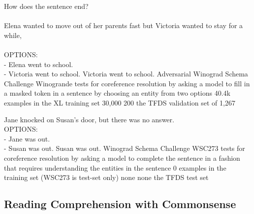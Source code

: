 \taskio
{How does the sentence end?\\\\Elena wanted to move out of her parents fast but Victoria wanted to stay for a while, \\\\OPTIONS:\\- Elena went to school.\\- Victoria went to school.}
{Victoria went to school.}
{
    \taskdescription
    {Adversarial Winograd Schema Challenge} %
    {Winogrande} %
    {\citep{sakaguchi2020winogrande}} %
    {tests for coreference resolution by asking a model to fill in a masked token in a sentence by choosing an entity from two options} %
    {40.4k examples in the XL training set} %
    {30,000} %
    {200} %
    {the TFDS validation set of 1,267} %
}

\taskio
{Jane knocked on Susan's door, but there was no answer.\\OPTIONS:\\- Jane was out.\\- Susan was out.}
{Susan was out.}
{
    \taskdescription
    {Winograd Schema Challenge} %
    {WSC273} %
    {\citep{levesque2012winograd}} %
    {tests for coreference resolution by asking a model to complete the sentence in a fashion that requires understanding the entities in the sentence} %
    {0 examples in the training set (WSC273 is test-set only)} %
    {none} %
    {none} %
    {the TFDS test set} %
}



\clearpage
\subsection{Reading Comprehension with Commonsense}\label{appen:b-read-comp-commonsense}



